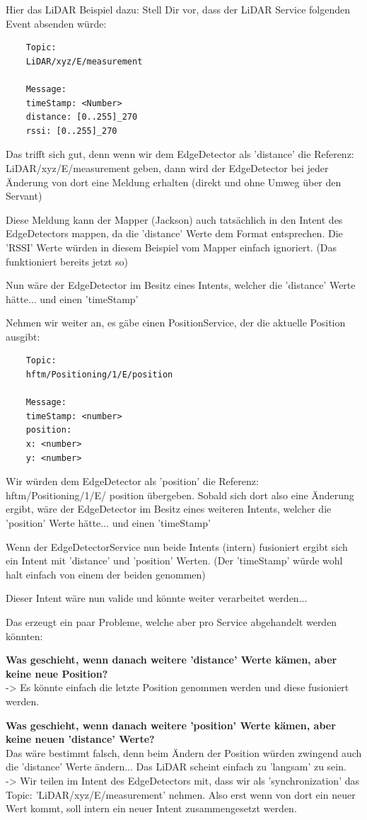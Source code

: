 \begin{formal}
	Hier das LiDAR Beispiel dazu:
	Stell Dir vor, dass der LiDAR  Service folgenden Event absenden würde:
	\begin{verbatim}
	Topic:
	LiDAR/xyz/E/measurement
	
	Message:
	timeStamp: <Number>
	distance: [0..255]_270
	rssi: [0..255]_270
	\end{verbatim}
	
	Das trifft sich gut, denn wenn wir dem EdgeDetector als 'distance' die Referenz: LiDAR/xyz/E/measurement geben, dann wird der EdgeDetector bei jeder Änderung von dort eine Meldung erhalten (direkt und ohne Umweg über den Servant)
	
	Diese Meldung kann der Mapper (Jackson) auch tatsächlich in den Intent des EdgeDetectors mappen, da die 'distance' Werte dem Format entsprechen. Die 'RSSI' Werte würden in diesem Beispiel vom Mapper einfach ignoriert. (Das funktioniert bereits jetzt so)
	
	Nun wäre der EdgeDetector im Besitz eines Intents, welcher die 'distance' Werte hätte... und einen 'timeStamp'
	
	Nehmen wir weiter an, es gäbe einen PositionService, der die aktuelle Position ausgibt:
	\begin{verbatim}
	Topic:
	hftm/Positioning/1/E/position
	
	Message:
	timeStamp: <number>
	position:
	x: <number>
	y: <number>
	\end{verbatim}
	
	Wir würden dem EdgeDetector als 'position' die Referenz: hftm/Positioning/1/E/ position übergeben. Sobald sich dort also eine Änderung ergibt, wäre der EdgeDetector im Besitz eines weiteren Intents, welcher die 'position' Werte hätte... und einen 'timeStamp'
	
	Wenn der EdgeDetectorService nun beide Intents (intern) fusioniert ergibt sich ein Intent mit 'distance' und 'position' Werten. (Der 'timeStamp' würde wohl halt einfach von einem der beiden genommen)
	
	Dieser Intent wäre nun valide und könnte weiter verarbeitet werden...
	
	
	Das erzeugt ein paar Probleme, welche aber pro Service abgehandelt werden könnten:
	
	\textbf{Was geschieht, wenn danach weitere 'distance' Werte kämen, aber keine neue Position?}\\
	-> Es könnte einfach die letzte Position genommen werden und diese fusioniert werden.
	
	\textbf{Was geschieht, wenn danach weitere 'position' Werte kämen, aber keine neuen 'distance' Werte?}\\
	Das wäre bestimmt falsch, denn beim Ändern der Position würden zwingend auch die 'distance' Werte ändern... Das LiDAR scheint einfach zu 'langsam' zu sein.\\
	-> Wir teilen im Intent des EdgeDetectors mit, dass wir als 'synchronization' das Topic: 'LiDAR/xyz/E/measurement' nehmen. Also erst wenn von dort ein neuer Wert kommt, soll intern ein neuer Intent zusammengesetzt werden.
	

\end{formal}
